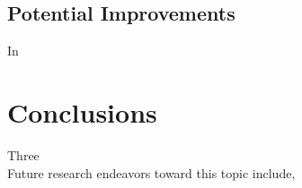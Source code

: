 \documentclass[conference]{IEEEtran}
\begin{document}



\subsection{Potential Improvements}
In 




\section{Conclusions} \label{Conclusions}
Three \\
\indent
Future research endeavors toward this topic include, 
\end{document}
